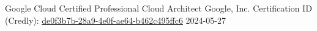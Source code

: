 \awarditem
    {Google Cloud Certified Professional Cloud Architect}
    {Google, Inc.}
    {Certification ID (Credly): \href{https://www.credly.com/badges/de0f3b7b-28a9-4e0f-ae64-b462c495ffc6}{de0f3b7b-28a9-4e0f-ae64-b462c495ffc6}}
    {2024-05-27}
